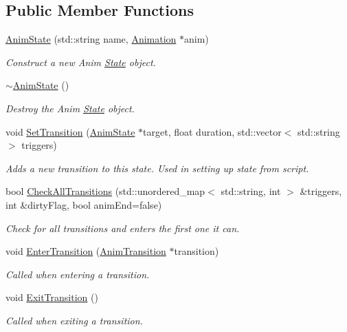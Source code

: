\subsection*{Public Member Functions}
\begin{DoxyCompactItemize}
\item 
\hyperlink{structAnimState_aade1f3a6b816a8ca9848891d9907a3b0}{Anim\+State} (std\+::string name, \hyperlink{structAnimation}{Animation} $\ast$anim)
\begin{DoxyCompactList}\small\item\em Construct a new Anim \hyperlink{classState}{State} object. \end{DoxyCompactList}\item 
\mbox{\label{structAnimState_a6b1a2fd5b38143d7230ec3e9e7803d8b}} 
\hyperlink{structAnimState_a6b1a2fd5b38143d7230ec3e9e7803d8b}{$\sim$\+Anim\+State} ()
\begin{DoxyCompactList}\small\item\em Destroy the Anim \hyperlink{classState}{State} object. \end{DoxyCompactList}\item 
void \hyperlink{structAnimState_a3f768e0e2231e5ef88cc5c99ba504530}{Set\+Transition} (\hyperlink{structAnimState}{Anim\+State} $\ast$target, float duration, std\+::vector$<$ std\+::string $>$ triggers)
\begin{DoxyCompactList}\small\item\em Adds a new transition to this state. Used in setting up state from script. \end{DoxyCompactList}\item 
bool \hyperlink{structAnimState_a5093653b23837023c0f077388915af20}{Check\+All\+Transitions} (std\+::unordered\+\_\+map$<$ std\+::string, int $>$ \&triggers, int \&dirty\+Flag, bool anim\+End=false)
\begin{DoxyCompactList}\small\item\em Check for all transitions and enters the first one it can. \end{DoxyCompactList}\item 
void \hyperlink{structAnimState_aceb8e4d8277433e1963513e09efdfd13}{Enter\+Transition} (\hyperlink{structAnimTransition}{Anim\+Transition} $\ast$transition)
\begin{DoxyCompactList}\small\item\em Called when entering a transition. \end{DoxyCompactList}\item 
\mbox{\label{structAnimState_a9cf2327df0e266aa2b0b997cb657e8c7}} 
void \hyperlink{structAnimState_a9cf2327df0e266aa2b0b997cb657e8c7}{Exit\+Transition} ()
\begin{DoxyCompactList}\small\item\em Called when exiting a transition. \end{DoxyCompactList}\end{DoxyCompactItemize}

